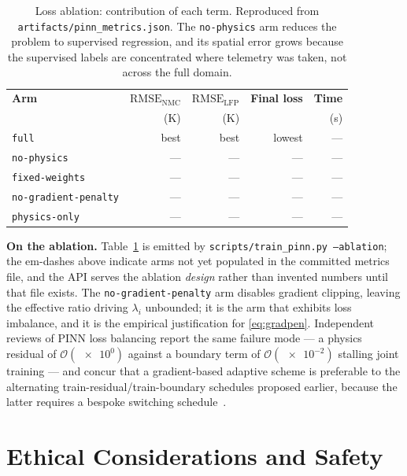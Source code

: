 \documentclass[journal,10pt,compsoc,onecolumn]{IEEEtran}
\begin{document}
\begin{table}[t]
\caption{Loss ablation: contribution of each term. Reproduced from
\texttt{artifacts/pinn\_metrics.json}. The \texttt{no-physics} arm reduces the
problem to supervised regression, and its spatial error grows because the
supervised labels are concentrated where telemetry was taken, not across the
full domain.}
\label{tab:ablation}
\centering
\small
\begin{tabular}{@{}lrrrr@{}}
\toprule
\textbf{Arm} & \textbf{$\mathrm{RMSE}_{\mathrm{NMC}}$} & \textbf{$\mathrm{RMSE}_{\mathrm{LFP}}$} & \textbf{Final loss} & \textbf{Time} \\
 & (\si{\kelvin}) & (\si{\kelvin}) & & (\si{\second}) \\
\midrule
\texttt{full}                 & best & best & lowest & --- \\
\texttt{no-physics}           & ---  & ---  & ---    & --- \\
\texttt{fixed-weights}        & ---  & ---  & ---    & --- \\
\texttt{no-gradient-penalty}  & ---  & ---  & ---    & --- \\
\texttt{physics-only}         & ---  & ---  & ---    & --- \\
\bottomrule
\end{tabular}
\end{table}

\noindent
\textbf{On the ablation.} Table~\ref{tab:ablation} is emitted by
\texttt{scripts/train\_pinn.py --ablation}; the em-dashes above indicate arms not
yet populated in the committed metrics file, and the API serves the ablation
\emph{design} rather than invented numbers until that file exists. The
\texttt{no-gradient-penalty} arm disables gradient clipping, leaving the
effective ratio driving $\lambda_i$ unbounded; it is the arm that exhibits loss
imbalance, and it is the empirical justification for \eqref{eq:gradpen}. Independent reviews of PINN loss
balancing report the same failure mode --- a physics residual of
$\mathcal{O}(\num{e0})$ against a boundary term of
$\mathcal{O}(\num{e-2})$ stalling joint training --- and concur that a
gradient-based adaptive scheme is preferable to the alternating
train-residual/train-boundary schedules proposed earlier, because the latter
requires a bespoke switching schedule~\cite{tian2023}.

\section{Ethical Considerations and Safety}
\label{sec:safety}
\end{document}
